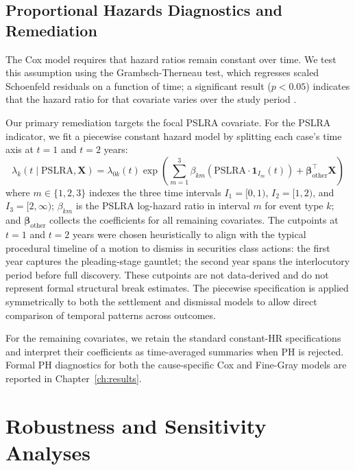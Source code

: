 \subsection{Proportional Hazards Diagnostics and Remediation}
\label{sec:ph_diag}

The Cox model requires that hazard ratios remain constant over time. We test this assumption using the Grambsch-Therneau test, which regresses scaled Schoenfeld residuals on a function of time; a significant result ($p < 0.05$) indicates that the hazard ratio for that covariate varies over the study period \citep{grambsch1994}.

Our primary remediation targets the focal PSLRA covariate.
For the PSLRA indicator, we fit a piecewise constant hazard
model by splitting each case's time axis at $t = 1$ and
$t = 2$ years:
\begin{equation}
\lambda_k(t \mid \text{PSLRA}, \mathbf{X}) = \lambda_{0k}(t) \exp \left( \sum_{m=1}^{3} \beta_{km} \left( \text{PSLRA} \cdot \mathbf{1}_{I_m}(t) \right) + \boldsymbol{\beta}_{\text{other}}^\top \mathbf{X} \right)
\end{equation}
where $m \in \{1,2,3\}$ indexes the three time intervals $I_1 = [0,1)$, $I_2 = [1,2)$, and $I_3 = [2,\infty)$; $\beta_{km}$ is the PSLRA log-hazard ratio in interval $m$ for event type $k$; and $\boldsymbol{\beta}_{\text{other}}$ collects the coefficients for all remaining covariates.
The cutpoints at $t = 1$ and $t = 2$ years were chosen
heuristically to align with the typical procedural timeline
of a motion to dismiss in securities class actions: the first
year captures the pleading-stage gauntlet; the second year
spans the interlocutory period before full discovery. These
cutpoints are not data-derived and do not represent formal
structural break estimates. The piecewise specification is
applied symmetrically to both the settlement and dismissal
models to allow direct comparison of temporal patterns across
outcomes.

For the remaining covariates, we retain the standard
constant-HR specifications and interpret their coefficients
as time-averaged summaries when PH is rejected. Formal PH
diagnostics for both the cause-specific Cox and Fine-Gray
models are reported in Chapter~\ref{ch:results}.

\section{Robustness and Sensitivity Analyses}

